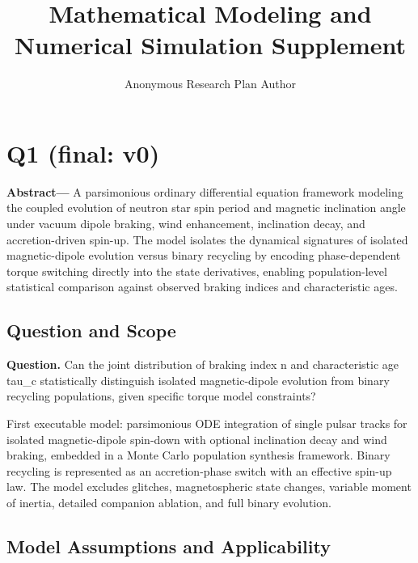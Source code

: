 \documentclass[11pt]{article}
\title{Mathematical Modeling and Numerical Simulation Supplement}
\author{Anonymous Research Plan Author}
\date{}
\begin{document}
\maketitle

\section{Q1 (final: v0)}

\noindent\textbf{Abstract—} A parsimonious ordinary differential equation framework modeling the coupled evolution of neutron star spin period and magnetic inclination angle under vacuum dipole braking, wind enhancement, inclination decay, and accretion-driven spin-up. The model isolates the dynamical signatures of isolated magnetic-dipole evolution versus binary recycling by encoding phase-dependent torque switching directly into the state derivatives, enabling population-level statistical comparison against observed braking indices and characteristic ages.

\subsection{Question and Scope}

\noindent\textbf{Question.} Can the joint distribution of braking index n and characteristic age tau\_c statistically distinguish isolated magnetic-dipole evolution from binary recycling populations, given specific torque model constraints?



First executable model: parsimonious ODE integration of single pulsar tracks for isolated magnetic-dipole spin-down with optional inclination decay and wind braking, embedded in a Monte Carlo population synthesis framework. Binary recycling is represented as an accretion-phase switch with an effective spin-up law. The model excludes glitches, magnetospheric state changes, variable moment of inertia, detailed companion ablation, and full binary evolution.

\subsection{Model Assumptions and Applicability}
\end{document}
